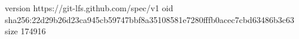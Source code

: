 version https://git-lfs.github.com/spec/v1
oid sha256:22d29b26d23ca945cb59747bbf8a35108581e7280fffb0acec7cbd63486b3c63
size 174916
